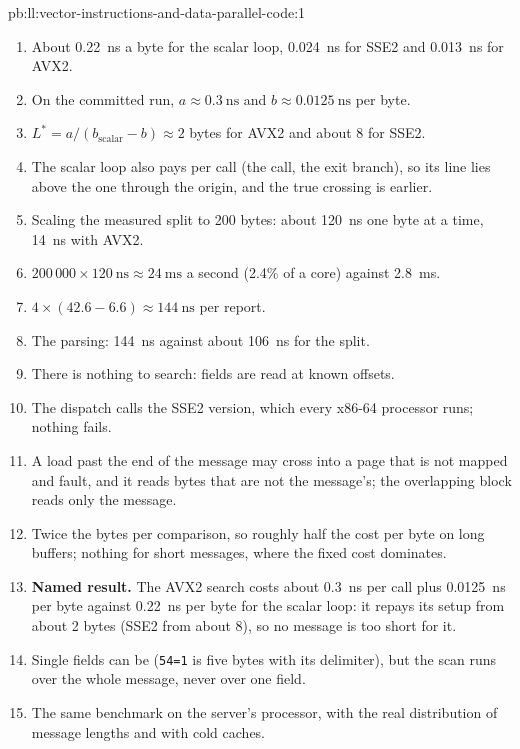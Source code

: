 \begin{solution}{pb:ll:vector-instructions-and-data-parallel-code:1}
\begin{enumerate}
\item About \qty{0.22}{\nano\second} a byte for the scalar loop, \qty{0.024}{\nano\second} for SSE2 and \qty{0.013}{\nano\second}
for AVX2.
\item On the committed run, $a \approx \qty{0.3}{\nano\second}$ and $b \approx \qty{0.0125}{\nano\second}$ per byte.
\item $L^* = a/(b_{\text{scalar}} - b) \approx 2$ bytes for AVX2 and about 8 for SSE2.
\item The scalar loop also pays per call (the call, the exit branch), so its line lies above the one through the origin, and
the true crossing is earlier.
\item Scaling the measured split to 200 bytes: about \qty{120}{\nano\second} one byte at a time, \qty{14}{\nano\second} with AVX2.
\item $200\,000 \times \qty{120}{\nano\second} \approx \qty{24}{\milli\second}$ a second (2.4\% of a core) against
\qty{2.8}{\milli\second}.
\item $4 \times (42.6 - 6.6) \approx \qty{144}{\nano\second}$ per report.
\item The parsing: \qty{144}{\nano\second} against about \qty{106}{\nano\second} for the split.
\item There is nothing to search: fields are read at known offsets.
\item The dispatch calls the SSE2 version, which every x86-64 processor runs; nothing fails.
\item A load past the end of the message may cross into a page that is not mapped and fault, and it reads bytes that are not
the message's; the overlapping block reads only the message.
\item Twice the bytes per comparison, so roughly half the cost per byte on long buffers; nothing for short messages, where the
fixed cost dominates.
\item \textbf{Named result.} The AVX2 search costs about \qty{0.3}{\nano\second} per call plus \qty{0.0125}{\nano\second} per
byte against \qty{0.22}{\nano\second} per byte for the scalar loop: it repays its setup from about 2 bytes (SSE2 from about
8), so no message is too short for it.
\item Single fields can be (\texttt{54=1} is five bytes with its delimiter), but the scan runs over the whole message, never
over one field.
\item The same benchmark on the server's processor, with the real distribution of message lengths and with cold caches.

\end{enumerate}
\end{solution}
